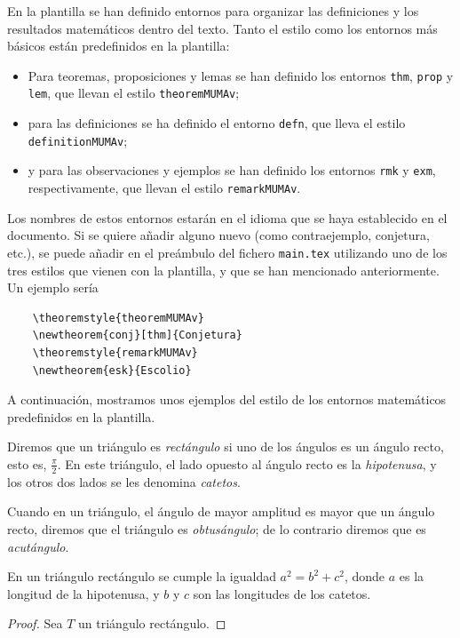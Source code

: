 En la plantilla se han definido entornos para organizar las definiciones y los resultados matemáticos dentro del texto. Tanto el estilo como los entornos más básicos están predefinidos en la plantilla: 
\begin{itemize}
    \item Para teoremas, proposiciones y lemas se han definido los entornos \texttt{thm}, \texttt{prop} y \texttt{lem}, que llevan el estilo \texttt{theoremMUMAv};
    \item para las definiciones se ha definido el entorno \texttt{defn}, que lleva el estilo \texttt{definitionMUMAv};
    \item y para las observaciones y ejemplos se han definido los entornos \texttt{rmk} y \texttt{exm}, respectivamente, que llevan el estilo \texttt{remarkMUMAv}.
\end{itemize}
Los nombres de estos entornos estarán en el idioma que se haya establecido en el documento. Si se quiere añadir alguno nuevo (como contraejemplo, conjetura, etc.), se puede añadir en el preámbulo del fichero \texttt{main.tex} utilizando uno de los tres estilos que vienen con la plantilla, y que se han mencionado anteriormente. Un ejemplo sería
\begin{verbatim}
    \theoremstyle{theoremMUMAv}
    \newtheorem{conj}[thm]{Conjetura}
    \theoremstyle{remarkMUMAv}
    \newtheorem{esk}{Escolio}
\end{verbatim}

A continuación, mostramos unos ejemplos del estilo de los entornos matemáticos predefinidos en la plantilla.
\begin{defn}
    Diremos que un triángulo es \emph{rectángulo} si uno de los ángulos es un ángulo recto, esto es, $\tfrac\pi2$. En este triángulo, el lado opuesto al ángulo recto es la \emph{hipotenusa}, y los otros dos lados se les denomina \emph{catetos}.

    Cuando en un triángulo, el ángulo de mayor amplitud es mayor que un ángulo recto, diremos que el triángulo es \emph{obtusángulo}; de lo contrario diremos que es \emph{acutángulo}.
\end{defn}

\begin{thm}
    En un triángulo rectángulo se cumple la igualdad $a^2=b^2+c^2$, donde $a$ es la longitud de la hipotenusa, y $b$ y $c$ son las longitudes de los catetos.
\end{thm}
\begin{proof}
    Sea $T$ un triángulo rectángulo.
\end{proof}

